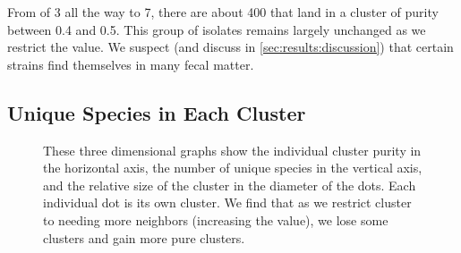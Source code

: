 From \minneigh{} of 3 all the way to 7, there are about 400 \isols{} that land in a cluster of purity between 0.4 and 0.5.  
This group of isolates remains largely unchanged as we restrict the \minneigh{} value.
We suspect (and discuss in \autoref{sec:results:discussion}) that certain \ecoli{} strains find themselves in many \spec{} fecal matter.

\subsection{Unique Species in Each Cluster}\label{sec:results:unique}

\begin{figure}
    \centering
    \hfill
    \hfill

    \caption{These three dimensional graphs show the individual cluster purity in the horizontal axis, the number of unique species in the vertical axis, and the relative size of the cluster in the diameter of the dots. Each individual dot is its own cluster. We find that as we restrict cluster to needing more neighbors (increasing the \minneigh{} value), we lose some clusters and gain more pure clusters.}
    \label{fig:clust_pure}
\end{figure}

